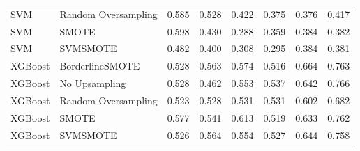 \begin{tabular}{llllllll}
                         SVM & Random Oversampling & 0.585 &                     0.528 &                 0.422 &                  0.375 &                                   0.376 &     0.417 \\
                         SVM &               SMOTE & 0.598 &                     0.430 &                 0.288 &                  0.359 &                                   0.384 &     0.382 \\
                         SVM &            SVMSMOTE & 0.482 &                     0.400 &                 0.308 &                  0.295 &                                   0.384 &     0.381 \\
                     XGBoost &     BorderlineSMOTE & 0.528 &                     0.563 &                 0.574 &                  0.516 &                                   0.664 &     0.763 \\
                     XGBoost &       No Upsampling & 0.528 &                     0.462 &                 0.553 &                  0.537 &                                   0.642 &     0.766 \\
                     XGBoost & Random Oversampling & 0.523 &                     0.528 &                 0.531 &                  0.531 &                                   0.602 &     0.682 \\
                     XGBoost &               SMOTE & 0.577 &                     0.541 &                 0.613 &                  0.519 &                                   0.633 &     0.762 \\
                     XGBoost &            SVMSMOTE & 0.526 &                     0.564 &                 0.554 &                  0.527 &                                   0.644 &     0.758 \\
\bottomrule
\end{tabular}
